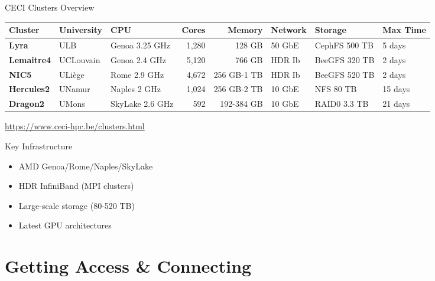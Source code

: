 \documentclass[aspectratio=169]{beamer}
\begin{document}
\begin{frame}{CECI Clusters Overview}
\begin{table}
\centering
\scriptsize
\begin{tabular}{lllrrlll}
\toprule
\textbf{Cluster} & \textbf{University} & \textbf{CPU} & \textbf{Cores} & \textbf{Memory} & \textbf{Network} & \textbf{Storage} & \textbf{Max Time} \\
\midrule
\textbf{Lyra} & ULB & Genoa 3.25 GHz & 1,280 & 128 GB & 50 GbE & CephFS 500 TB & 5 days \\
\textbf{Lemaitre4} & UCLouvain & Genoa 2.4 GHz & 5,120 & 766 GB & HDR Ib & BeeGFS 320 TB & 2 days \\

\textbf{NIC5} & ULiège & Rome 2.9 GHz & 4,672 & 256 GB-1 TB & HDR Ib & BeeGFS 520 TB & 2 days \\

\textbf{Hercules2} & UNamur & Naples 2 GHz & 1,024 & 256 GB-2 TB & 10 GbE & NFS 80 TB & 15 days \\

\textbf{Dragon2} & UMons & SkyLake 2.6 GHz & 592 & 192-384 GB & 10 GbE & RAID0 3.3 TB & 21 days \\
\bottomrule
\end{tabular}
\end{table}

\vspace{0.3em}

\centering
\url{https://www.ceci-hpc.be/clusters.html}
\begin{exampleblock}{Key Infrastructure}
\begin{itemize}
    \item AMD Genoa/Rome/Naples/SkyLake
    \item HDR InfiniBand (MPI clusters)
    \item Large-scale storage (80-520 TB)
    \item Latest GPU architectures
\end{itemize}
\end{exampleblock}


\end{frame}

\section{Getting Access \& Connecting}
\end{document}
